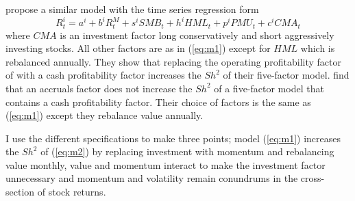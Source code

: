 \textcite{fama2016choosing} propose a similar model with the time series regression form
\begin{equation}
\label{eq:m2}
R_t^i=a^i+b^iR_t^M+s^iSMB_t+h^iHML_t+p^iPMU_t+c^iCMA_t
\end{equation}
where $CMA$ is an investment factor long conservatively and short aggressively investing
stocks. All other factors are as in (\ref{eq:m1}) except for $HML$ which is rebalanced
annually. They show that replacing the operating profitability factor of
\textcite{fama2015five} with a cash profitability factor increases the $Sh^2$ of their
five-factor model. \textcite{ball2016accruals} find that an accruals factor does not
increase the $Sh^2$ of a five-factor model that contains a cash profitability factor.
Their choice of factors is the same as (\ref{eq:m1}) except they rebalance value annually.

I use the different specifications to make three points; model (\ref{eq:m1}) increases the
$Sh^2$ of (\ref{eq:m2}) by replacing investment with momentum and rebalancing value
monthly, value and momentum interact to make the investment factor unnecessary and
momentum and volatility remain conundrums in the cross-section of stock returns.
